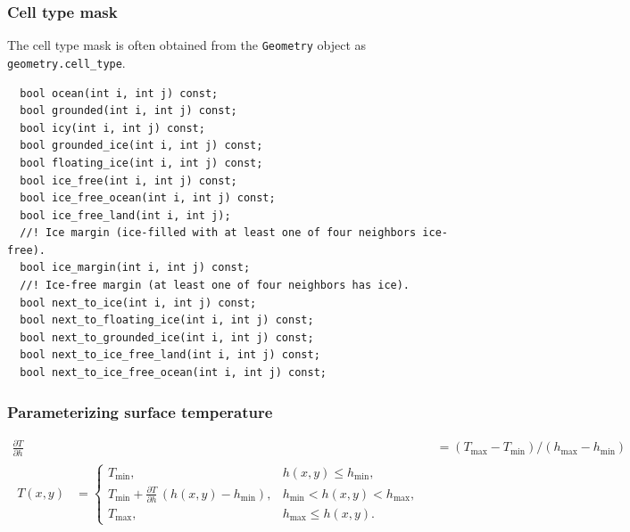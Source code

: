 \documentclass[hide notes,intlimits]{beamer}
\newcommand{\diff}[2]{\frac{\partial #1}{\partial #2}}
\begin{document}
\begin{frame}[fragile]
  \frametitle{Cell type mask}

  The cell type mask is often obtained from the \texttt{Geometry}
  object as \texttt{geometry.cell\_type}.

  \medskip
\begin{lstlisting}
  bool ocean(int i, int j) const;
  bool grounded(int i, int j) const;
  bool icy(int i, int j) const;
  bool grounded_ice(int i, int j) const;
  bool floating_ice(int i, int j) const;
  bool ice_free(int i, int j) const;
  bool ice_free_ocean(int i, int j) const;
  bool ice_free_land(int i, int j);
  //! Ice margin (ice-filled with at least one of four neighbors ice-free).
  bool ice_margin(int i, int j) const;
  //! Ice-free margin (at least one of four neighbors has ice).
  bool next_to_ice(int i, int j) const;
  bool next_to_floating_ice(int i, int j) const;
  bool next_to_grounded_ice(int i, int j) const;
  bool next_to_ice_free_land(int i, int j) const;
  bool next_to_ice_free_ocean(int i, int j) const;

\end{lstlisting}
\end{frame}

\newcommand{\var}[2]{ {#1}_{\text{#2}} }
\newcommand{\h}[1]{ \var{h}{#1} }
\newcommand{\T}[1]{ \var{T}{#1} }
\newcommand{\m}[1]{ \var{m}{#1} }

\begin{frame}
  \frametitle{Parameterizing surface temperature}
  \begin{align*}
    \diff{T}{h} &= (\T{max} - \T{min}) / (\h{max} - \h{min})\\
    \begin{split}T(x,y) &=
      \begin{cases}
        \T{min}, & h(x,y) \le \h{min}, \\
        \T{min} + \diff{T}{h} \, (h(x,y) - \h{min}), & \h{min} < h(x,y) < \h{max}, \\
        \T{max}, & \h{max} \le h(x,y).
      \end{cases}
    \end{split}\\
  \end{align*}
\end{frame}
\end{document}
